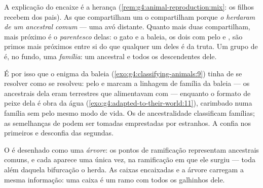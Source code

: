 \begin{proposition}\label{prop:g6:classification-kinship:kinship}
A explicação do encaixe é a herança
(\cref{rem:g4:animal-reproduction:mix}: os filhos recebem dos pais).
As  que compartilham um  o compartilham porque
\emph{o herdaram de um ancestral comum} --- uma  avó distante.
Quanto mais  duas  compartilham, mais próximo é o
\emph{parentesco} delas: o gato e a baleia, os dois
com pelo e , são primos mais próximos entre si do que qualquer um
deles é da truta. Um grupo de  é, no fundo, uma
\emph{família}: um ancestral e todos os descendentes dele.
\end{proposition}
\admitted

\begin{example}\label{ex:g6:classification-kinship:whale}
É por isso que o enigma da baleia
(\cref{exo:g4:classifying-animals:9}) tinha de se resolver como se
resolveu: pelo e  marcam a linhagem de família da baleia --- os
ancestrais dela eram  terrestres que alimentavam com 
--- enquanto o formato de peixe dela é obra da água
(\cref{exo:g4:adapted-to-their-world:11}), carimbado numa família sem
 pelo mesmo modo de vida. Os  de ancestralidade
classificam famílias; as semelhanças de  podem ser tomadas
emprestadas por estranhos. A  confia nos primeiros e
desconfia das segundas.
\end{example}

\begin{definition}\label{def:g6:classification-kinship:tree}
O  é desenhado como uma \emph{árvore}: os pontos de ramificação representam ancestrais comuns, e
cada  aparece uma única vez, na ramificação em que ele surgiu
--- toda  além daquela bifurcação o herda. As caixas encaixadas
e a árvore carregam a mesma informação: uma caixa é um ramo com todos
os galhinhos dele.
\end{definition}

